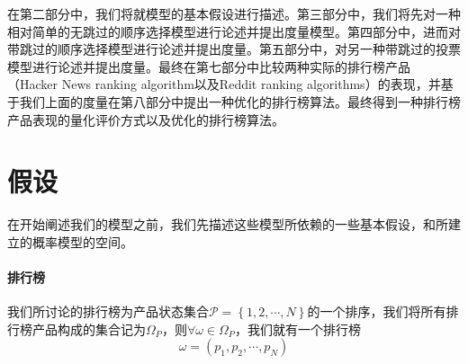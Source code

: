 \documentclass[UTF8]{ctexart}
\theoremstyle{plain}
\theoremstyle{definition}
\theoremstyle{remark}
\begin{document}
    在第二部分中，我们将就模型的基本假设进行描述。第三部分中，我们将先对一种相对简单的无跳过的顺序选择模型进行论述并提出度量模型。第四部分中，进而对带跳过的顺序选择模型进行论述并提出度量。第五部分中，对另一种带跳过的投票模型进行论述并提出度量。最终在第七部分中比较两种实际的排行榜产品（Hacker News ranking algorithm以及Reddit ranking algorithms）的表现，并基于我们上面的度量在第八部分中提出一种优化的排行榜算法。最终得到一种排行榜产品表现的量化评价方式以及优化的排行榜算法。

	\section{假设}
	在开始阐述我们的模型之前，我们先描述这些模型所依赖的一些基本假设，和所建立的概率模型的空间。
	\paragraph{排行榜} 我们所讨论的排行榜为产品状态集合$\mathcal{P}=\left\{1,2,\cdots,N \right\}$的一个排序，我们将所有排行榜产品构成的集合记为$\Omega_P$，则$\forall \omega \in \Omega_P$，我们就有一个排行榜
	$$
	\omega = (p_1,p_2,\cdots,p_N)
	$$
\end{document}

